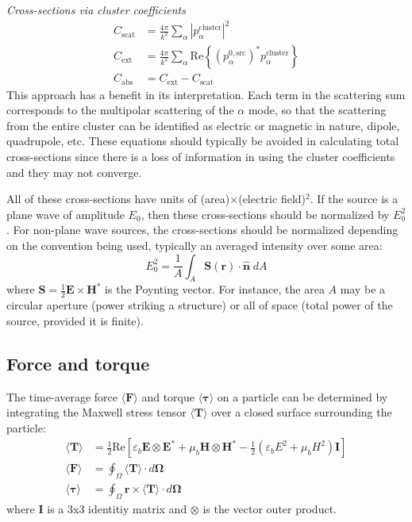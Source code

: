 \documentclass[11pt]{article}
\begin{document}
\hfill

\textit{Cross-sections via cluster coefficients} \cite{xu1995electromagnetic}
\begin{subequations}
\begin{align}
    C_\text{scat} &= \frac{4\pi}{k^2} \sum_{\alpha}
        |p_{\alpha}^\text{cluster}|^2 \\
    C_\text{ext} &= \frac{4\pi}{k^2} \sum_{\alpha}
    \text{Re} \left\{ (p_\alpha^{0,\text{src}})^* p_\alpha^\text{cluster} \right\} \\
    C_\text{abs} &= C_\text{ext} - C_\text{scat}
\end{align}
\end{subequations}
This approach has a benefit in its interpretation.
Each term in the scattering sum corresponds to the multipolar scattering of the  $\alpha$ mode, so that the scattering from the entire cluster can be identified as electric or magnetic in nature, dipole, quadrupole, etc.
These equations should typically be avoided in calculating total cross-sections since there is a loss of information in using the cluster coefficients and they may not converge.

All of these cross-sections have units of (area)$\times$(electric field)$^2$.
If the source is a plane wave of amplitude $E_0$, then these cross-sections should be normalized by $E_0^2$.
For non-plane wave sources, the cross-sections should be normalized depending on the convention being used, typically an averaged intensity over some area:
\begin{equation}
    E_0^2 = \frac{1}{A} \int_A \boldsymbol{S}(\boldsymbol{r}) 
    \cdot \bm{\hat n} \;dA
\end{equation}
where $\bm{S} = \frac{1}{2} \bm{E} \times \bm{H^*}$ is the Poynting vector.
For instance, the area $A$ may be a circular aperture (power striking a structure) or all of space (total power of the source, provided it is finite).

\subsection{Force and torque}
\newcommand{\mst}{\langle \boldsymbol{T} \rangle}

The time-average force $\langle \bm{F} \rangle$ and torque $\langle \bm{\tau} \rangle$ on a particle can be determined by integrating the Maxwell stress tensor $\mst$ over a closed surface surrounding the particle:
\begin{subequations}
\begin{align}
    \mst &= \frac{1}{2} \text{Re} \left[ \varepsilon_b  \boldsymbol{E} \otimes \boldsymbol{E^*} + \mu_b \boldsymbol{H} \otimes \boldsymbol{H^*}
    - \frac{1}{2}(\varepsilon_b E^2 + \mu_b H^2)\boldsymbol{I} \right] \\
    \langle \boldsymbol{F} \rangle &= \oint_\Omega \mst \cdot d \boldsymbol{\Omega} \\
    \langle \boldsymbol{\tau} \rangle &= \oint_\Omega \boldsymbol{r} \times \mst \cdot d \boldsymbol{\Omega}
\end{align}
\end{subequations}
where $\bm{I}$ is a 3x3 identitiy matrix and $\otimes$ is the vector outer product.
\end{document}
